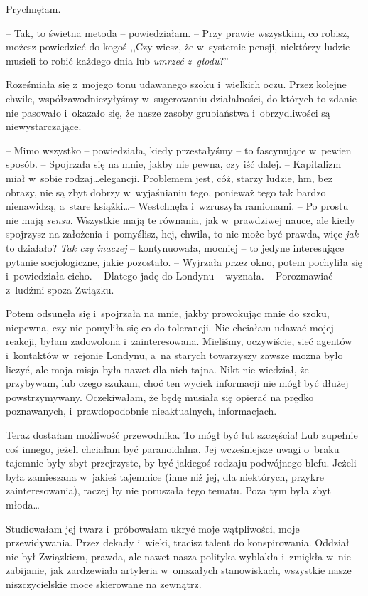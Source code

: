 \documentclass[oneside,polish,11pt,sfheadings]{mwbk}
\begin{document}
Prychnęłam. 

-- Tak, to świetna metoda -- powiedziałam. -- Przy prawie
wszystkim, co robisz, możesz powiedzieć do kogoś ,,Czy wiesz, że w~systemie pensji, niektórzy ludzie musieli to robić każdego dnia lub
\textit{umrzeć z~głodu}?''

Roześmiała się z~mojego tonu udawanego szoku i~wielkich oczu. Przez
kolejne chwile, współzawodniczyłyśmy w~sugerowaniu działalności, do
których to zdanie nie pasowało i~okazało się, że nasze zasoby
grubiaństwa i~obrzydliwości są niewystarczające.

-- Mimo wszystko -- powiedziała, kiedy przestałyśmy -- to fascynujące w~pewien sposób. -- Spojrzała się na mnie, jakby nie pewna, czy iść dalej.
-- Kapitalizm miał w~sobie rodzaj\ldots  elegancji. Problemem jest, cóż,
starzy ludzie, hm, bez obrazy, nie są zbyt dobrzy w~wyjaśnianiu tego,
ponieważ tego tak bardzo nienawidzą, a~stare książki\ldots  -- Westchnęła i~wzruszyła ramionami. -- Po prostu nie mają \textit{sensu}. Wszystkie mają
te równania, jak w~prawdziwej nauce, ale kiedy spojrzysz na założenia i~pomyślisz, hej, chwila, to nie może być prawda, więc \textit{jak} to
działało? \textit{Tak czy inaczej }-- kontynuowała, mocniej -- to jedyne
interesujące pytanie socjologiczne, jakie pozostało. -- Wyjrzała przez
okno, potem pochyliła się i~powiedziała cicho. -- Dlatego jadę do Londynu
-- wyznała. -- Porozmawiać z~ludźmi spoza Związku.

Potem odsunęła się i~spojrzała na mnie, jakby prowokując mnie do szoku,
niepewna, czy nie pomyliła się co do tolerancji. Nie chciałam udawać
mojej reakcji, byłam zadowolona i~zainteresowana. Mieliśmy, oczywiście,
sieć agentów i~kontaktów w~rejonie Londynu, a~na starych towarzyszy
zawsze można było liczyć, ale moja misja była nawet dla nich tajna. Nikt
nie wiedział, że przybywam, lub czego szukam, choć ten wyciek informacji
nie mógł być dłużej powstrzymywany. Oczekiwałam, że będę musiała się
opierać na prędko poznawanych, i~prawdopodobnie nieaktualnych,
informacjach.

Teraz dostałam możliwość przewodnika. To mógł być łut szczęścia! Lub
zupełnie coś innego, jeżeli chciałam być paranoidalna. Jej wcześniejsze
uwagi o~braku tajemnic były zbyt przejrzyste, by być jakiegoś rodzaju
podwójnego blefu. Jeżeli była zamieszana w~jakieś tajemnice (inne niż
jej, dla niektórych, przykre zainteresowania), raczej by nie poruszała
tego tematu. Poza tym była zbyt młoda\ldots 

Studiowałam jej twarz i~próbowałam ukryć moje wątpliwości, moje
przewidywania. Przez dekady i~wieki, tracisz talent do konspirowania.
Oddział nie był Związkiem, prawda, ale nawet nasza polityka wyblakła i~zmiękła w~nie-zabijanie, jak zardzewiała artyleria w~omszałych
stanowiskach, wszystkie nasze niszczycielskie moce skierowane na
zewnątrz.
\end{document}
